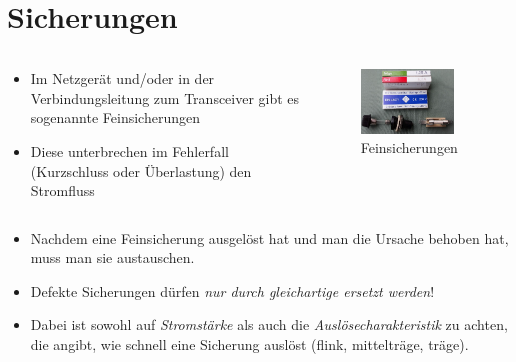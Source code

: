
\section{Sicherungen}
\label{section:sicherungen}
\begin{frame}%

\begin{columns}
    \begin{column}{0.48\textwidth}
    \begin{itemize}
  \item Im Netzgerät und/oder in der Verbindungsleitung zum Transceiver gibt es sogenannte Feinsicherungen
  \item Diese unterbrechen im Fehlerfall (Kurzschluss oder Überlastung) den Stromfluss
  \end{itemize}

    \end{column}
   \begin{column}{0.48\textwidth}
       
\begin{figure}
    \includegraphics[width=0.85\textwidth]{foto/88}
    \caption{\scriptsize Feinsicherungen}
    \label{n_feinsicherungen}
\end{figure}

   \end{column}
\end{columns}

\end{frame}

\begin{frame}\begin{itemize}
  \item Nachdem eine Feinsicherung ausgelöst hat und man die Ursache behoben hat, muss man sie austauschen.
  \item Defekte Sicherungen dürfen \emph{nur durch gleichartige ersetzt werden}!
  \item Dabei ist sowohl auf \emph{Stromstärke} als auch die \emph{Auslösecharakteristik} zu achten, die angibt, wie schnell eine Sicherung auslöst (flink, mittelträge, träge).
  \end{itemize}
\end{frame}

